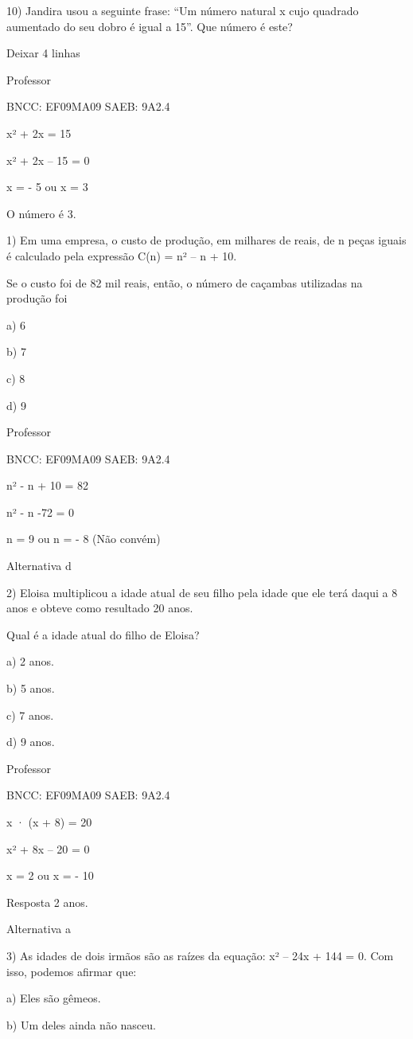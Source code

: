 \begin{escolha}
{{{\begin{escolha}
{10) Jandira usou a seguinte frase: ``Um número natural x cujo quadrado
aumentado do seu dobro é igual a 15''. Que número é este?

Deixar 4 linhas

Professor

BNCC: EF09MA09 SAEB: 9A2.4

x² + 2x = 15

x² + 2x -- 15 = 0

x = - 5 ou x = 3

O número é 3.


1) Em uma empresa, o custo de produção, em milhares de reais, de n peças
iguais é calculado pela expressão C(n) = n² -- n + 10.

Se o custo foi de 82 mil reais, então, o número de caçambas utilizadas
na produção foi

a) 6

b) 7

c) 8

d) 9

Professor

BNCC: EF09MA09 SAEB: 9A2.4

n² - n + 10 = 82

n² - n -72 = 0

n = 9 ou n = - 8 (Não convém)

Alternativa d

2) Eloisa multiplicou a idade atual de seu filho pela idade que ele terá
daqui a 8 anos e obteve como resultado 20 anos.

Qual é a idade atual do filho de Eloisa?

a) 2 anos.

b) 5 anos.

c) 7 anos.

d) 9 anos.

Professor

BNCC: EF09MA09 SAEB: 9A2.4

x · (x + 8) = 20

x² + 8x -- 20 = 0

x = 2 ou x = - 10

Resposta 2 anos.

Alternativa a

3) As idades de dois irmãos são as raízes da equação: x² -- 24x + 144 =
0. Com isso, podemos afirmar que:

a) Eles são gêmeos.

b) Um deles ainda não nasceu.

}
\end{escolha}}}}
\end{escolha}
